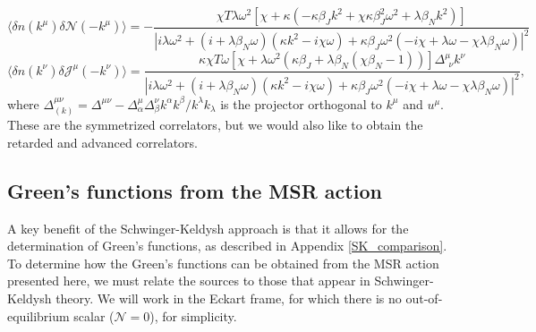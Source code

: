 \documentclass[aps,prd,nofootinbib,amsmath,amssymb,showpacs,longbibliography,singlecolumn,superscriptaddress,notitlepage]{revtex4-1}
\theoremstyle{plain}
\theoremstyle{definition}
\begin{document}
\begin{equation}
    \langle \delta n(k^{\mu}) \delta \mathcal{N}(-k^{\mu}) \rangle = -\frac{\chi T \lambda \omega^2 \left[ \chi + \kappa \left( -\kappa \beta_J k^2 + \chi \kappa \beta_J^2 \omega^2 + \lambda \beta_N k^2 \right) \right]}{\left| i \lambda \omega^2 + (i + \lambda \beta_N \omega) \left( \kappa k^2 - i \chi \omega \right) + \kappa \beta_J \omega^2 \left( -i\chi + \lambda \omega - \chi \lambda \beta_N \omega \right) \right|^2}
\end{equation}
\begin{equation}
    \langle \delta n(k^{\nu}) \delta \mathcal{J}^{\mu}(-k^{\nu}) \rangle = \frac{\kappa \chi T \omega \left[ \chi + \lambda \omega^2 \left( \kappa \beta_J + \lambda \beta_N (\chi \beta_N - 1) \right) \right] \Delta^{\mu}_{\:\: \nu} k^{\nu}}{\left| i \lambda \omega^2 + (i + \lambda \beta_N \omega) \left( \kappa k^2 - i \chi \omega \right) + \kappa \beta_J \omega^2 \left( -i\chi + \lambda \omega - \chi \lambda \beta_N \omega \right) \right|^2}  ,
\end{equation}
where $\Delta^{\mu\nu}_{(k)} = \Delta^{\mu\nu} - \Delta^{\mu}_{\alpha} \Delta^{\nu}_{\beta} k^{\alpha} k^{\beta} / k^{\lambda} k_{\lambda}$ is the projector orthogonal to $k^{\mu}$ and $u^{\mu}$. These are the symmetrized correlators, but we would also like to obtain the retarded and advanced correlators. 

\subsection{Green's functions from the MSR action}
\label{Sec:Green_fns}

A key benefit of the Schwinger-Keldysh approach is that it allows for the determination of Green's functions, as described in Appendix \ref{SK_comparison}. To determine how the Green's functions can be obtained from the MSR action presented here, we must relate the sources to those that appear in Schwinger-Keldysh theory. We will work in the Eckart frame, for which there is no out-of-equilibrium scalar ($\mathcal{N} = 0$), for simplicity.
\end{document}
